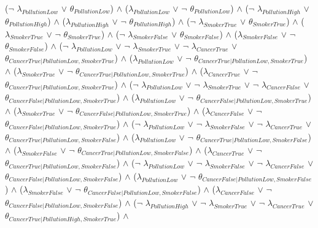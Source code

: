 \documentclass[a4paper,10pt]{report}
\begin{document}
\begin{center}
($\neg$ $\lambda_{PollutionLow}$ $\lor$ $\theta_{PollutionLow}$) $\land$ 
 ($\lambda_{PollutionLow}$ $\lor$ $\neg$ $\theta_{PollutionLow}$) $\land$ 
 ($\neg$ $\lambda_{PollutionHigh}$ $\lor$ $\theta_{PollutionHigh}$) $\land$ 
 ($\lambda_{PollutionHigh}$ $\lor$ $\neg$ $\theta_{PollutionHigh}$) $\land$ 
 ($\neg$ $\lambda_{SmokerTrue}$ $\lor$ $\theta_{SmokerTrue}$) $\land$ 
 ($\lambda_{SmokerTrue}$ $\lor$ $\neg$ $\theta_{SmokerTrue}$) $\land$ 
 ($\neg$ $\lambda_{SmokerFalse}$ $\lor$ $\theta_{SmokerFalse}$) $\land$ 
 ($\lambda_{SmokerFalse}$ $\lor$ $\neg$ $\theta_{SmokerFalse}$) $\land$ 
 ($\neg$ $\lambda_{PollutionLow}$ $\lor$ $\neg$ $\lambda_{SmokerTrue}$ $\lor$ $\neg$ $\lambda_{CancerTrue}$ $\lor$ $\theta_{CancerTrue|PollutionLow,SmokerTrue}$) $\land$ 
 ($\lambda_{PollutionLow}$ $\lor$ $\neg$ $\theta_{CancerTrue|PollutionLow,SmokerTrue}$) $\land$ 
 ($\lambda_{SmokerTrue}$ $\lor$ $\neg$ $\theta_{CancerTrue|PollutionLow,SmokerTrue}$) $\land$ 
 ($\lambda_{CancerTrue}$ $\lor$ $\neg$ $\theta_{CancerTrue|PollutionLow,SmokerTrue}$) $\land$ 
 ($\neg$ $\lambda_{PollutionLow}$ $\lor$ $\neg$ $\lambda_{SmokerTrue}$ $\lor$ $\neg$ $\lambda_{CancerFalse}$ $\lor$ $\theta_{CancerFalse|PollutionLow,SmokerTrue}$) $\land$ 
 ($\lambda_{PollutionLow}$ $\lor$ $\neg$ $\theta_{CancerFalse|PollutionLow,SmokerTrue}$) $\land$ 
 ($\lambda_{SmokerTrue}$ $\lor$ $\neg$ $\theta_{CancerFalse|PollutionLow,SmokerTrue}$) $\land$ 
 ($\lambda_{CancerFalse}$ $\lor$ $\neg$ $\theta_{CancerFalse|PollutionLow,SmokerTrue}$) $\land$ 
 ($\neg$ $\lambda_{PollutionLow}$ $\lor$ $\neg$ $\lambda_{SmokerFalse}$ $\lor$ $\neg$ $\lambda_{CancerTrue}$ $\lor$ $\theta_{CancerTrue|PollutionLow,SmokerFalse}$) $\land$ 
 ($\lambda_{PollutionLow}$ $\lor$ $\neg$ $\theta_{CancerTrue|PollutionLow,SmokerFalse}$) $\land$ 
 ($\lambda_{SmokerFalse}$ $\lor$ $\neg$ $\theta_{CancerTrue|PollutionLow,SmokerFalse}$) $\land$ 
 ($\lambda_{CancerTrue}$ $\lor$ $\neg$ $\theta_{CancerTrue|PollutionLow,SmokerFalse}$) $\land$ 
 ($\neg$ $\lambda_{PollutionLow}$ $\lor$ $\neg$ $\lambda_{SmokerFalse}$ $\lor$ $\neg$ $\lambda_{CancerFalse}$ $\lor$ $\theta_{CancerFalse|PollutionLow,SmokerFalse}$) $\land$ 
 ($\lambda_{PollutionLow}$ $\lor$ $\neg$ $\theta_{CancerFalse|PollutionLow,SmokerFalse}$) $\land$ 
 ($\lambda_{SmokerFalse}$ $\lor$ $\neg$ $\theta_{CancerFalse|PollutionLow,SmokerFalse}$) $\land$ 
 ($\lambda_{CancerFalse}$ $\lor$ $\neg$ $\theta_{CancerFalse|PollutionLow,SmokerFalse}$) $\land$ 
 ($\neg$ $\lambda_{PollutionHigh}$ $\lor$ $\neg$ $\lambda_{SmokerTrue}$ $\lor$ $\neg$ $\lambda_{CancerTrue}$ $\lor$ $\theta_{CancerTrue|PollutionHigh,SmokerTrue}$) $\land$ 

\end{center}
\end{document}
